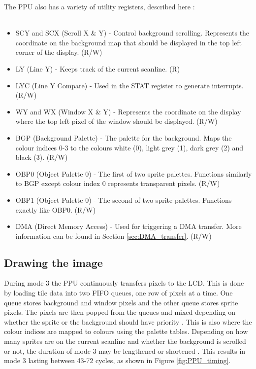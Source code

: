 \vspace{30pt}

The PPU also has a variety of utility registers, described here \cite{pandocsVideo}:\\
\\
\begin{itemize}
    \item SCY and SCX (Scroll X \& Y) - Control background scrolling. Represents the coordinate on the background map that should be displayed in the top left corner of the display. (R/W)
    \item LY (Line Y) - Keeps track of the current scanline. (R)
    \item LYC (Line Y Compare) - Used in the STAT register to generate interrupts. (R/W)
    \item WY and WX (Window X \& Y) - Represents the coordinate on the display where the top left pixel of the window should be displayed. (R/W)
    \item BGP (Background Palette) - The palette for the background. Maps the colour indices 0-3 to the colours white (0), light grey (1), dark grey (2) and black (3). (R/W)
    \item OBP0 (Object Palette 0) - The first of two sprite palettes. Functions similarly to BGP except colour index 0 represents transparent pixels. (R/W)
    \item OBP1 (Object Palette 0) - The second of two sprite palettes. Functions exactly like OBP0. (R/W)
    \item DMA (Direct Memory Access) - Used for triggering a DMA transfer. More information can be found in Section \ref{sec:DMA_transfer}.  (R/W)
\end{itemize}
\newpage
\subsection{Drawing the image}
\label{sec:PPU_Drawing}
During mode 3 the PPU continuously transfers pixels to the LCD. This is done by loading tile data into two FIFO queues, one row of pixels at a time. One queue stores background  and window pixels and the other queue stores sprite pixels. The pixels are then popped from the queues and mixed depending on whether the sprite or the background should have priority \cite{pandocsDrawing}. This is also where the colour indices are mapped to colours using the palette tables. Depending on how many sprites are on the current scanline and whether the background is scrolled or not, the duration of mode 3 may be lengthened or shortened \cite{pandocsDrawing}. This results in mode 3 lasting between 43-72 cycles, as shown in Figure \ref{fig:PPU_timing}.

